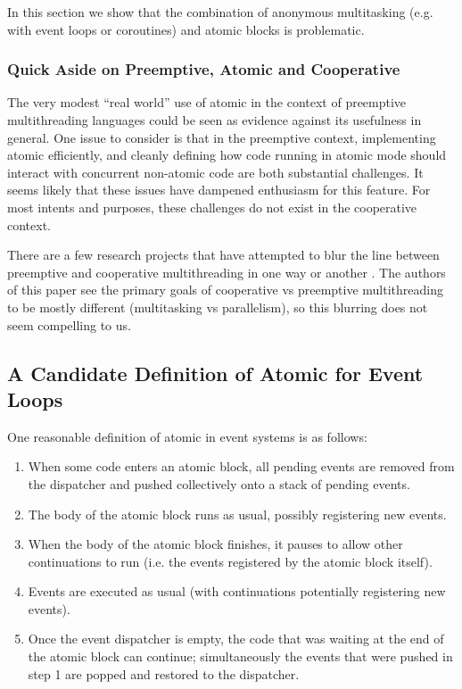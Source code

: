 \documentclass[acmsmall,anonymous,review]{acmart}\settopmatter{printfolios=true,printccs=false,printacmref=false}
\begin{document}
In this section we show that the combination of anonymous multitasking (e.g. with event loops or coroutines) and atomic blocks is problematic.

\subsubsection{Quick Aside on Preemptive, Atomic and Cooperative}

The very modest ``real world'' use of atomic in the context of preemptive multithreading languages could be seen as evidence against its usefulness in general.
One issue to consider is that in the preemptive context, implementing atomic efficiently, and cleanly defining how code running in atomic mode should interact with concurrent non-atomic code are both substantial challenges.
It seems likely that these issues have dampened enthusiasm for this feature.
For most intents and purposes, these challenges do not exist in the cooperative context.

There are a few research projects that have attempted to blur the line between preemptive and cooperative multithreading in one way or another \cite{ONeill2015, Boussinot2006, Dabrowski2006}.
The authors of this paper see the primary goals of cooperative vs preemptive multithreading to be mostly different (multitasking vs parallelism), so this blurring does not seem compelling to us.

\subsection{A Candidate Definition of Atomic for Event Loops} \label{sec:candidate_atomic}

One reasonable definition of atomic in event systems is as follows:


\begin{enumerate}
\item When some code enters an atomic block, all pending events are removed from the dispatcher and pushed collectively onto a stack of pending events.
\item The body of the atomic block runs as usual, possibly registering new events.
\item When the body of the atomic block finishes, it pauses to allow other continuations to run (i.e. the events registered by the atomic block itself).
\item Events are executed as usual (with continuations potentially registering new events).
\item Once the event dispatcher is empty, the code that was waiting at the end of the atomic block can continue; simultaneously the events that were pushed in step 1 are popped and restored to the dispatcher.
\end{enumerate}
\end{document}
